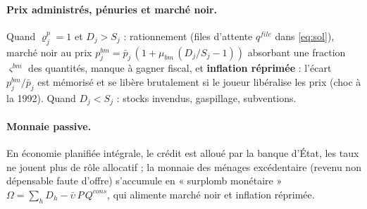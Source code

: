 \documentclass[11pt,a4paper]{article}
\newcommand{\og}{« }
\newcommand{\fg}{ »}
\begin{document}
\paragraph{Prix administrés, pénuries et marché noir.} Quand $\varrho^p_j = 1$ et $D_j > S_j$ : rationnement (files d'attente $q^{file}$ dans \eqref{eq:sol}), marché noir au prix $p^{bm}_j = \bar p_j\,(1 + \mu_{bm}\, (D_j/S_j - 1))$ absorbant une fraction $\varsigma^{bm}$ des quantités, manque à gagner fiscal, et \textbf{inflation réprimée} : l'écart $p^{bm}_j/\bar p_j$ est mémorisé et se libère brutalement si le joueur libéralise les prix (choc à la 1992). Quand $D_j < S_j$ : stocks invendus, gaspillage, subventions.

\paragraph{Monnaie passive.} En économie planifiée intégrale, le crédit est alloué par la banque d'État, les taux ne jouent plus de rôle allocatif ; la monnaie des ménages excédentaire (revenu non dépensable faute d'offre) s'accumule en \og surplomb monétaire\fg{} $\Omega = \sum_h D_h - \bar\upsilon\, P\, Q^{cons}$, qui alimente marché noir et inflation réprimée.
\end{document}
